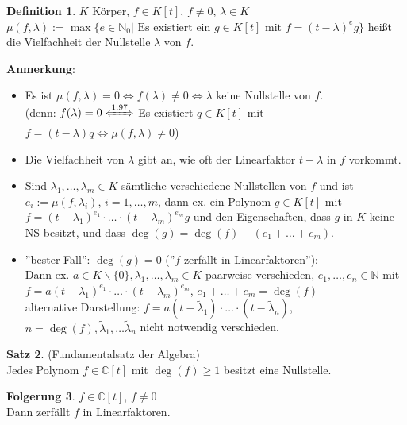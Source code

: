\documentclass[10pt,a4paper,numbers=endperiod]{scrartcl}
\theoremstyle{definition}
\newtheorem{satz}{Satz}[section]
\newtheorem{defi}[satz]{Definition}
\newtheorem{folg}[satz]{Folgerung}
\begin{document}
\begin{defi}
	$K$ Körper, $f \in K[t]$, $f \neq 0$, $\lambda \in K$\\
	$\mu(f,\lambda):= \max\{e\in \mathbb{N}_0| \text{ Es existiert ein } g \in K[t] \text{ mit } f = (t-\lambda)^{e}g\}$ heißt die Vielfachheit der Nullstelle $\lambda$ von $f$.
\end{defi}

\textbf{Anmerkung}: \begin{itemize}
	\item Es ist $\mu(f,\lambda) = 0 \Leftrightarrow f(\lambda) \neq 0 \Leftrightarrow \lambda$ keine Nullstelle von $f$.\\
	(denn: $f(\lambda) = 0 \xLeftrightarrow[]{1.97}$ Es existiert $q \in K[t]$ mit $f = (t-\lambda)q \Leftrightarrow \mu(f,\lambda) \neq 0$)
	\item Die Vielfachheit von $\lambda$ gibt an, wie oft der Linearfaktor $t-\lambda$ in $f$ vorkommt.
	\item Sind $\lambda_1, \dots , \lambda_m \in K$ sämtliche verschiedene Nullstellen von $f$ und ist $e_i := \mu(f, \lambda_i)$, $i=1, \dots ,m$, dann ex. ein Polynom $g \in K[t]$ mit $f= (t-\lambda_1)^{e_1} \cdot \ldots \cdot (t-\lambda_m)^{e_m} g$ und den Eigenschaften, dass $g$ in $K$ keine NS besitzt, und dass $\deg(g) = \deg(f) - (e_1+ \dots +e_m)$.
	\item ''bester Fall'': $\deg(g) = 0$ (''$f$ zerfällt in Linearfaktoren''):\\
	Dann ex. $a \in K\backslash\{0\}, \lambda_1, \dots, \lambda_m \in K$ paarweise verschieden, $e_1, \dots, e_n \in \mathbb{N}$ mit $f=a(t-\lambda_1)^{e_1} \cdot \ldots \cdot (t-\lambda_m)^{e_m}$, $e_1+ \dots+ e_m = \deg(f)$\\
	alternative Darstellung: $f=a(t-\tilde{\lambda}_1) \cdot \ldots \cdot(t-\tilde{\lambda}_n)$, $n=\deg(f), \tilde{\lambda}_1, \dots \tilde{\lambda}_n$ nicht notwendig verschieden. 
\end{itemize}

\begin{satz}
	(Fundamentalsatz der Algebra)\\
	Jedes Polynom $f \in \mathbb{C}[t]$ mit $\deg(f) \geq 1$ besitzt eine Nullstelle. 
\end{satz}

\begin{folg}
	$f \in \mathbb{C}[t]$, $f \neq 0$\\
	Dann zerfällt $f$ in Linearfaktoren. 
\end{folg}
\end{document}
